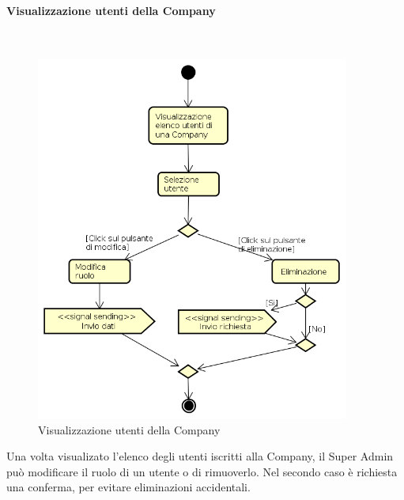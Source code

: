 \paragraph{Visualizzazione utenti della Company} \mbox{} \\
\begin{figure}[H]
\begin{center}
\includegraphics[height=12cm]{res/sections/backend/activities/operazioniUtentiSA.png}
\caption{Visualizzazione utenti della Company}
\end{center}
\end{figure}
Una volta visualizato l'elenco degli utenti iscritti alla Company, il Super Admin può modificare il ruolo di un utente o di rimuoverlo. Nel secondo caso è richiesta una conferma, per evitare eliminazioni accidentali.
